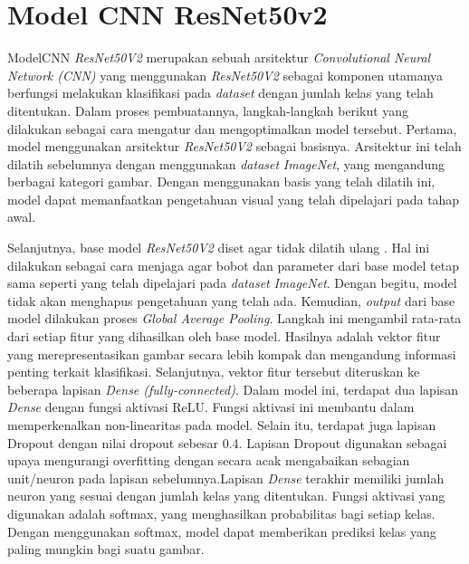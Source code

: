 \section{Model CNN ResNet50v2}
ModelCNN \textit{ResNet50V2} merupakan sebuah arsitektur \textit{Convolutional Neural Network (CNN)} yang menggunakan \textit{ResNet50V2} sebagai komponen utamanya berfungsi melakukan klasifikasi pada \textit{dataset} dengan jumlah kelas yang telah ditentukan. Dalam proses pembuatannya, langkah-langkah berikut yang dilakukan sebagai cara mengatur dan mengoptimalkan model tersebut. Pertama, model menggunakan arsitektur \textit{ResNet50V2} sebagai basisnya. Arsitektur ini telah dilatih sebelumnya dengan menggunakan \textit{dataset} \textit{ImageNet}, yang mengandung berbagai kategori gambar. Dengan menggunakan basis yang telah dilatih ini, model dapat memanfaatkan pengetahuan visual yang telah dipelajari pada tahap awal.

Selanjutnya, base model \textit{ResNet50V2} diset agar tidak dilatih ulang . Hal ini dilakukan sebagai cara menjaga agar bobot dan parameter dari base model tetap sama seperti yang telah dipelajari pada \textit{dataset} \textit{ImageNet}. Dengan begitu, model tidak akan menghapus pengetahuan yang telah ada. Kemudian, \textit{output} dari base model dilakukan proses \textit{Global Average Pooling}. Langkah ini mengambil rata-rata dari setiap fitur yang dihasilkan oleh base model. Hasilnya adalah vektor fitur yang merepresentasikan gambar secara lebih kompak dan mengandung informasi penting terkait klasifikasi. Selanjutnya, vektor fitur tersebut diteruskan ke beberapa lapisan\textit{ Dense (fully-connected)}. Dalam model ini, terdapat dua lapisan\textit{ Dense} dengan fungsi aktivasi ReLU. Fungsi aktivasi ini membantu dalam memperkenalkan non-linearitas pada model. Selain itu, terdapat juga lapisan Dropout dengan nilai dropout sebesar 0.4. Lapisan Dropout digunakan sebagai upaya mengurangi overfitting dengan secara acak mengabaikan sebagian unit/neuron pada lapisan sebelumnya.Lapisan\textit{ Dense} terakhir memiliki jumlah neuron yang sesuai dengan jumlah kelas yang ditentukan. Fungsi aktivasi yang digunakan adalah softmax, yang menghasilkan probabilitas bagi setiap kelas. Dengan menggunakan softmax, model dapat memberikan prediksi kelas yang paling mungkin bagi suatu gambar.

